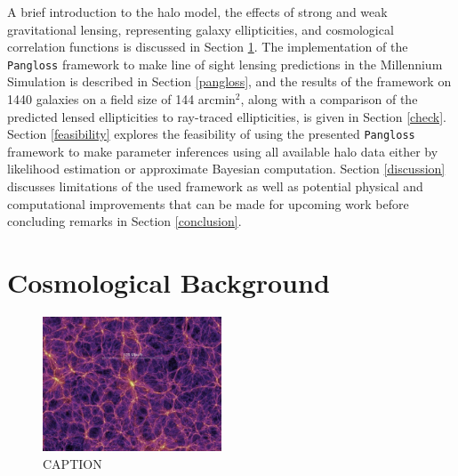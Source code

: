 \documentclass[%
 reprint,
 amsmath,amssymb,
 aps,nofootinbib
]{revtex4-1}
\begin{document}
A brief introduction to the halo model, the effects of strong and weak gravitational lensing, representing galaxy ellipticities, and cosmological correlation functions is discussed in Section \ref{background}. The implementation of the \texttt{Pangloss} framework to make line of sight lensing predictions in the Millennium Simulation is described in Section \ref{pangloss}, and the results of the framework on 1440 galaxies on a field size of 144 arcmin$^2$, along with a comparison of the predicted lensed ellipticities to ray-traced ellipticities, is given in Section \ref{check}. Section \ref{feasibility} explores the feasibility of using the presented \texttt{Pangloss} framework to make parameter inferences using all available halo data either by likelihood estimation or approximate Bayesian computation. Section \ref{discussion} discusses limitations of the used framework as well as potential physical and computational improvements that can be made for upcoming work before concluding remarks in Section \ref{conclusion}.

\section{Cosmological Background} \label{background}

\begin{figure}
    \centering
    \includegraphics[width=0.475\textwidth]{figs-swe/thesis/ms_structure.jpg}
    \captionsetup{justification=raggedright,singlelinecheck=false}
    \caption{CAPTION}
    \label{fig:ms_structure}
\end{figure}
\end{document}
